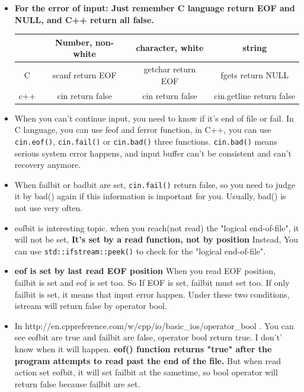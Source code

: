 \documentclass[a4paper,11pt,twoside]{book}
\newcommand{\tophline}{\hline }
\newcommand{\bottomhline}{\\ \hline }
\newcommand{\tophline}{ }
\newcommand{\bottomhline}{ }
\begin{document}
\begin{itemize}
	\item \textbf{For the error of input: Just remember C language return EOF and NULL, and C++ return all false. }
	
	\begin{tabular}{|c|c|c|c|}
		\tophline
		& Number, non-white & character, white  & string \\
		\tophline
		C & scanf return EOF & getchar return EOF & fgets return NULL \\
		\tophline
		c++ & cin return false & cin return false & cin.getline return false \bottomhline
	\end{tabular}
	
	\item When you can't continue input, you need to know if it's end of file or fail. In C language, you can use feof and ferror function, in C++, you can use \texttt{cin.eof()}, \texttt{cin.fail()} or \texttt{cin.bad()} three functions. \texttt{cin.bad()} means serious system error happens, and input buffer can't be consistent and can't recovery anymore.
	
	\item When failbit or badbit are set, \texttt{cin.fail()} return false, so you need to judge it by bad() again if this information is important for you.  Usually, bad() is not use very often.
	
	\item eofbit is interesting topic. when you reach(not read) the "logical end-of-file", it will not be set, \textbf{It's set by a read function, not by position}   Instead,  You can use \texttt{std::ifstream::peek()} to check for the "logical end-of-file".
	
	\item \textbf{eof is set by last read EOF position} When you read EOF position, failbit is set and eof is set too. So If EOF is set, failbit must set too.  If only failbit is set, it means that input error happen.  Under these two conditions, istream will return false by operator bool.
	
	\item In http://en.cppreference.com/w/cpp/io/basic\_ios/operator\_bool . You can see eofbit are true and failbit are false, operator bool return true. I don't' know when it will happen. \textbf{ eof() function returns "true" after the program attempts to read past the end of the file.}  But when read action set eofbit, it will set failbit at the sametime, so bool operator will return false because failbit are set.
	

\end{itemize}
\end{document}
